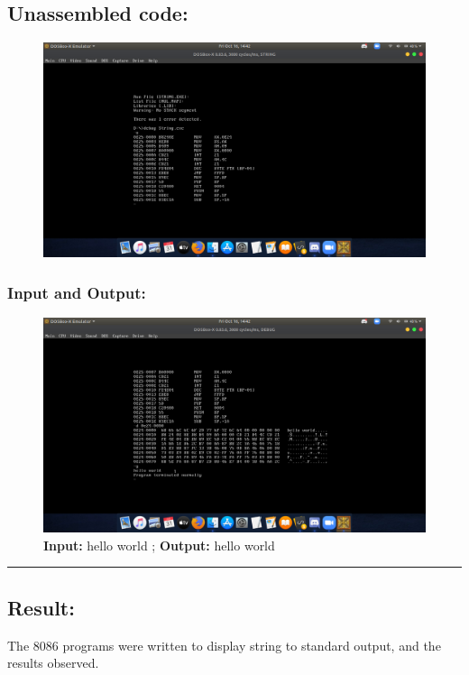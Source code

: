\documentclass[12pt,a4paper]{article}
\begin{document}
\begin{flushleft}
\newpage
\subsection*{\textbf{Unassembled code:}}
\begin{figure}[h]
    \centering
    \includegraphics[trim = 100mm 60mm 200mm 110mm, clip, width = \textwidth]{Pics/StrDispUS.png}
\end{figure}
\subsubsection*{\textbf{Input and Output:}}
\begin{figure}[h]
    \centering
    \includegraphics[trim = 100mm 60mm 100mm 180mm, clip, width = \textwidth]{Pics/StrDispIO.png}
    \caption{ \textbf{Input:} hello world ; \newline \hspace{1cm}
              \textbf{Output:} hello world}
\end{figure}
\hrule
\subsection*{\textbf{Result:}}
The 8086 programs were written to display string to standard output, and the results observed.
\end{flushleft}
\end{document}
